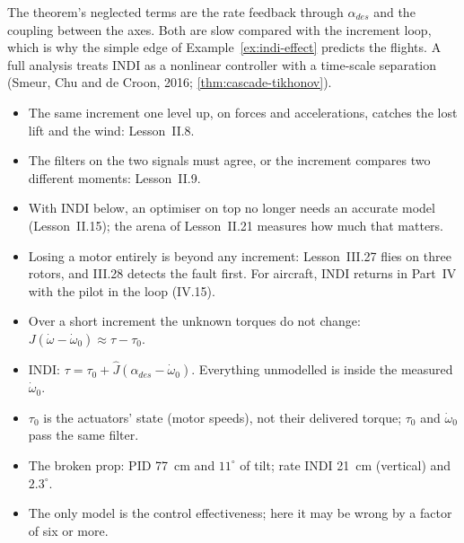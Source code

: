 The theorem's neglected terms are the rate feedback through $\alpha_{des}$ and the coupling between the axes. Both are slow compared with the increment loop, which is why the simple edge of Example~\ref{ex:indi-effect} predicts the flights. A full analysis treats INDI as a nonlinear controller with a time-scale separation (Smeur, Chu and de Croon, 2016; \cref{thm:cascade-tikhonov}).

\begin{lookahead}
\begin{itemize}[leftmargin=1.2em]
  \item The same increment one level up, on forces and accelerations, catches the lost lift and the wind: Lesson~II.8.
  \item The filters on the two signals must agree, or the increment compares two different moments: Lesson~II.9.
  \item With INDI below, an optimiser on top no longer needs an accurate model (Lesson~II.15); the arena of Lesson~II.21 measures how much that matters.
  \item Losing a motor entirely is beyond any increment: Lesson~III.27 flies on three rotors, and III.28 detects the fault first. For aircraft, INDI returns in Part~IV with the pilot in the loop (IV.15).
\end{itemize}
\end{lookahead}

\begin{remember}
\begin{itemize}
  \item Over a short increment the unknown torques do not change: $J(\dot\omega - \dot\omega_0) \approx \tau - \tau_0$.
  \item INDI: $\tau = \tau_0 + \hat J(\alpha_{des} - \dot\omega_0)$. Everything unmodelled is inside the measured $\dot\omega_0$.
  \item $\tau_0$ is the actuators' state (motor speeds), not their delivered torque; $\tau_0$ and $\dot\omega_0$ pass the same filter.
  \item The broken prop: PID \SI{77}{cm} and $11^\circ$ of tilt; rate INDI \SI{21}{cm} (vertical) and $2.3^\circ$.
  \item The only model is the control effectiveness; here it may be wrong by a factor of six or more.
\end{itemize}
\end{remember}

